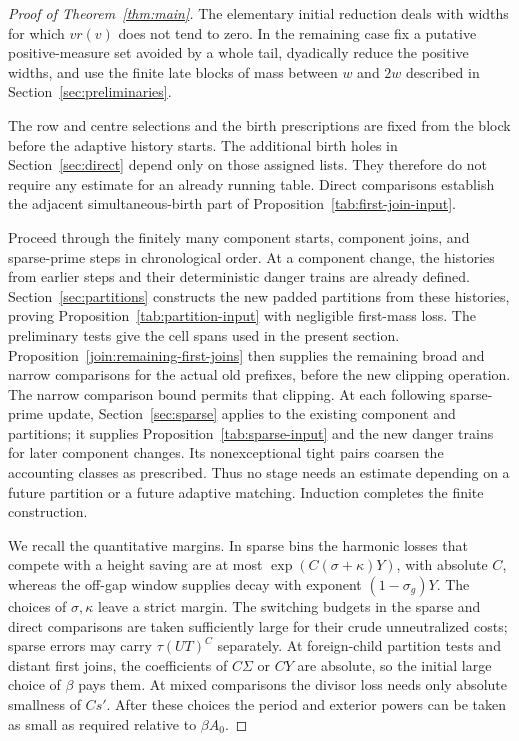 \begin{proof}[Proof of Theorem~\ref{thm:main}]
The elementary initial reduction deals with widths for which
$vr(v)$ does not tend to zero. In the remaining case fix a putative
positive-measure set avoided by a whole tail, dyadically reduce the
positive widths, and use the finite late blocks of mass between
$w$ and $2w$ described in Section~\ref{sec:preliminaries}.

The row and centre selections and the birth prescriptions are fixed
from the block before the adaptive history starts. The additional
birth holes in Section~\ref{sec:direct} depend only on those assigned
lists. They therefore do not require any estimate for an already
running table. Direct comparisons establish the adjacent simultaneous-birth
part of Proposition~\ref{tab:first-join-input}.

Proceed through the finitely many component starts, component joins,
and sparse-prime steps in chronological order. At a component change,
the histories from earlier steps and their deterministic danger
trains are already defined. Section~\ref{sec:partitions} constructs
the new padded partitions from these histories, proving
Proposition~\ref{tab:partition-input} with negligible first-mass
loss. The preliminary tests give the cell spans used in the present
section. Proposition~\ref{join:remaining-first-joins} then supplies
the remaining broad and narrow comparisons for the actual old
prefixes, before the new clipping operation. The narrow comparison
bound permits that clipping. At each following sparse-prime update,
Section~\ref{sec:sparse} applies to the existing component and
partitions; it supplies Proposition~\ref{tab:sparse-input} and the
new danger trains for later component changes. Its nonexceptional
tight pairs coarsen the accounting classes as prescribed. Thus no
stage needs an estimate depending on a future partition or a future
adaptive matching. Induction completes the finite construction.

We recall the quantitative margins. In sparse bins the harmonic
losses that compete with a height saving are at most
$\exp(C(\sigma+\kappa)Y)$, with absolute $C$, whereas the off-gap
window supplies decay with exponent $(1-\sigma_g)Y$. The choices of
$\sigma,\kappa$ leave a strict margin. The switching budgets in
the sparse and direct comparisons are taken sufficiently large for
their crude unneutralized costs; sparse errors may carry
$\tau(UT)^C$ separately. At foreign-child partition tests and
distant first joins, the coefficients of $C\Sigma$ or $CY$ are
absolute, so the initial large choice of $\beta$ pays them. At
mixed comparisons the divisor loss needs only absolute smallness
of $Cs'$. After these choices the period and exterior powers can be
taken as small as required relative to $\beta A_0$.


\end{proof}
